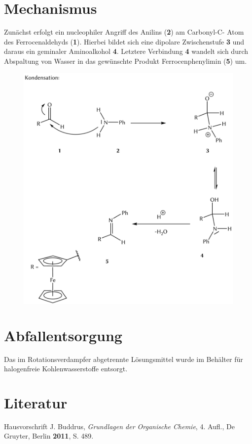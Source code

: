 \documentclass[12pt]{article}
\begin{document}
\begin{onehalfspace}
\section{Mechanismus\cite{bio}}
Zunächst erfolgt ein nucleophiler Angriff des Anilins (\textbf{2}) am Carbonyl-C-
Atom des Ferrocenaldehyds (\textbf{1}). Hierbei bildet sich eine dipolare Zwischenstufe \textbf{3} 
und daraus ein geminaler Aminoalkohol \textbf{4}. Letztere Verbindung \textbf{4} wandelt sich durch Abspaltung
von Wasser in das gewünschte Produkt Ferrocenphenylimin (\textbf{5}) um.
\begin{figure}[!htbp]
   \centering
\includegraphics[scale=0.27]{mechan.png}
\end{figure}

\section{Abfallentsorgung}
Das im Rotationsverdampfer abgetrennte Lösungsmittel wurde im Behälter für halogenfreie Kohlenwasserstoffe entsorgt.
\section{Literatur}
\renewcommand{\section}[2]{}%
\begin{thebibliography}{}
Hausvorschrift
J. Buddrus, \textit{Grundlagen der Organische Chemie}, 4. Aufl., De Gruyter, Berlin \textbf{2011}, S. 489.
\end{thebibliography}
\end{onehalfspace}
\end{document}
